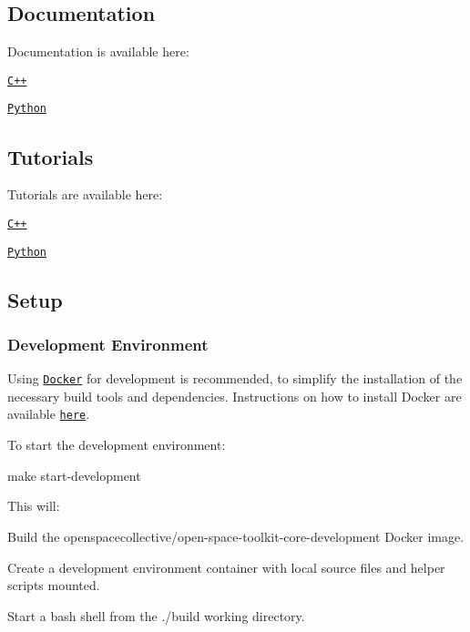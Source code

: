 \subsection*{Documentation}

Documentation is available here\+:


\begin{DoxyItemize}
\item \href{https://open-space-collective.github.io/open-space-toolkit-core}{\tt C++}
\item \href{./bindings/python/docs}{\tt Python}
\end{DoxyItemize}

\subsection*{Tutorials}

Tutorials are available here\+:


\begin{DoxyItemize}
\item \href{./tutorials/cpp}{\tt C++}
\item \href{./tutorials/python}{\tt Python}
\end{DoxyItemize}

\subsection*{Setup}

\subsubsection*{Development Environment}

Using \href{https://www.docker.com}{\tt Docker} for development is recommended, to simplify the installation of the necessary build tools and dependencies. Instructions on how to install Docker are available \href{https://docs.docker.com/install/}{\tt here}.

To start the development environment\+:


\begin{DoxyCode}
make start-development
\end{DoxyCode}


This will\+:


\begin{DoxyEnumerate}
\item Build the {\ttfamily openspacecollective/open-\/space-\/toolkit-\/core-\/development} Docker image.
\item Create a development environment container with local source files and helper scripts mounted.
\item Start a {\ttfamily bash} shell from the {\ttfamily ./build} working directory.
\end{DoxyEnumerate}

